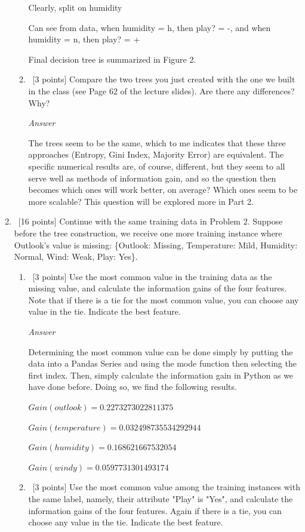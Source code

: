 \documentclass[12pt, fullpage,letterpaper]{article}
\begin{document}
\begin{enumerate}
\begin{enumerate}
    Clearly, split on humidity
    
    Can see from data, when humidity = h, then play? = -, and when humidity = n, then play? = +
    
    Final decision tree is summarized in Figure 2.
	
	\item~[3 points] Compare the two trees you just created with the one we built in the class (see Page 62 of the lecture slides). Are there any differences? Why?
	
	\emph{Answer}
	
	The trees seem to be the same, which to me indicates that these three approaches (Entropy, Gini Index, Majority Error) are equivalent. The specific numerical results are, of course, different, but they seem to all serve well as methods of information gain, and so the question then becomes which ones will work better, on average? Which ones seem to be more scalable? This question will be explored more in Part 2.
	
\end{enumerate}

\item~[16 points] Continue with the same training data in Problem 2. Suppose before the tree construction, we receive one more training instance where Outlook's value is missing: \{Outlook: Missing, Temperature: Mild, Humidity: Normal, Wind: Weak, Play: Yes\}. 

\begin{enumerate}
\item~[3 points] Use the most common value in the training data as the missing  value, and calculate the information gains of the four features. Note that if there is a tie for the most common value, you can choose any value in the tie.  Indicate the best feature. 

\emph{Answer}

Determining the most common value can be done simply by putting the data into a Pandas Series and using the mode function then selecting the first index. Then, simply calculate the information gain in Python as we have done before. Doing so, we find the following results.

$Gain(outlook)=0.2273273022811375$

$Gain(temperature)=0.032498735534292944$

$Gain(humidity)=0.168621667532054$

$Gain(windy)=0.0597731301493174$

\item~[3 points] Use the most common value among the  training instances with the same label, namely, their attribute "Play" is "Yes", and calculate the information gains of the four features. Again if there is a tie, you can choose any value in the tie. Indicate the best feature.


\end{enumerate}
\end{enumerate}
\end{document}
